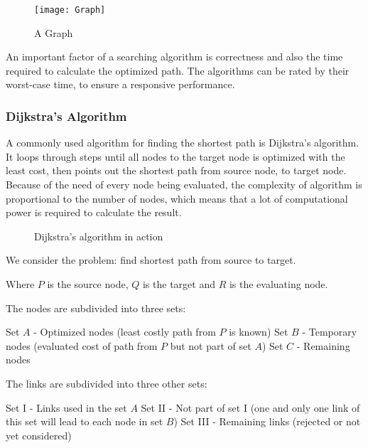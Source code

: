   \begin{figure}[ht!]
    \centering
    \texttt{[image: Graph]}
    \caption{A Graph}
    \label{overflow}
  \end{figure}

  An important factor of a searching algorithm is correctness and also the time required to calculate the optimized path.
  The algorithms can be rated by their worst-case time, to ensure a responsive performance.

  \subsubsection{Dijkstra's Algorithm}

  A commonly used algorithm for finding the shortest path is Dijkstra's algorithm. It loops through steps until all nodes to the target node is optimized with the least cost, then points out the shortest path from source node, to target node. Because of the need of every node being evaluated, the complexity of algorithm is proportional to the number of nodes, which means that a lot of computational power is required to calculate the result.  \cite{Dijkstra}

  \begin{figure}[ht!]
    \centering
    \caption{Dijkstra's algorithm in action}
    \label{overflow}
  \end{figure}

  We consider the problem: find shortest path from source to target.

  Where $P$ is the source node, $Q$ is the target and $R$ is the evaluating node.

  The nodes are subdivided into three sets:

  Set $A$ - Optimized nodes (least costly path from $P$ is known)
  Set $B$ - Temporary nodes (evaluated cost of path from $P$ but not part of set $A$)
  Set $C$ - Remaining nodes

  The links are subdivided into three other sets:

  Set \RN{1} - Links used in the set $A$
  Set \RN{2} - Not part of set I (one and only one link of this set will lead to each node in set $B$)
  Set \RN{3} - Remaining links (rejected or not yet considered)

